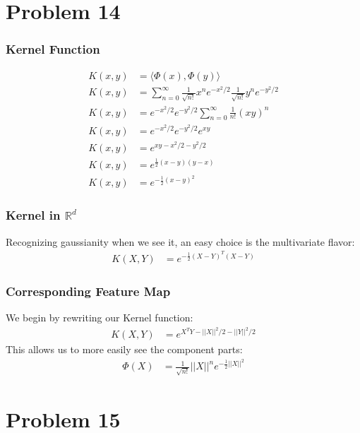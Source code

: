 \documentclass[a4paper,12pt]{article}
\begin{document}
\section*{Problem 14}

\subsubsection*{Kernel Function}

\begin{align*}
K(x,y) &= \langle \Phi(x), \Phi(y) \rangle \\
K(x,y) &= \sum_{n=0}^{\infty} \frac{1}{\sqrt{n!}}x^ne^{-x^2/2}\frac{1}{\sqrt{n!}}y^ne^{-y^2/2} \\
K(x,y) &= e^{-x^2/2}e^{-y^2/2} \sum_{n=0}^{\infty} \frac{1}{n!}(xy)^n \\
K(x,y) &=  e^{-x^2/2}e^{-y^2/2}e^{xy} \\
K(x,y) &=  e^{xy - x^2/2 -y^2/2} \\
K(x,y) &=  e^{\frac{1}{2}(x - y)(y - x)} \\
K(x,y) &=  e^{- \frac{1}{2}(x - y)^2}
\end{align*}

\subsubsection*{Kernel in $\mathbb{R}^d$}
Recognizing gaussianity when we see it, an easy choice is the multivariate flavor:
\begin{align*}
K(X,Y) &=  e^{- \frac{1}{2}(X - Y)^T(X - Y)}
\end{align*}

\subsubsection*{Corresponding Feature Map}

We begin by rewriting our Kernel function:
\begin{align*}
K(X,Y) &=  e^{X^TY - ||X||^2/2 - ||Y||^2/2}
\end{align*}
%
This allows us to more easily see the component parts:
\begin{align*}
\Phi(X) &= \frac{1}{\sqrt{n!}}||X||^n e^{-\frac{1}{2}||X||^2}
\end{align*}

\section*{Problem 15}
\end{document}
